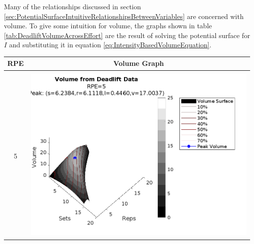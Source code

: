 Many of the relationships discussed in section \ref{sec:PotentialSurfaceIntuitiveRelationshipsBetweenVariables} are concerned with volume. To give some intuition for volume, the graphs shown in table \ref{tab:DeadliftVolumeAcrossEffort} are the result of solving the potential surface for $I$ and substituting it in equation \ref{eq:IntensityBasedVolumeEquation}.

\begin{table}[]
    \centering
    \begin{tabular}{c|c}
        RPE & Volume Graph \\%
        \hline \\
        
        5 &
        \includegraphics[width=139mm]{DeadliftVolume/5-1.png} \\%
        
        

\end{tabular}
\end{table}
